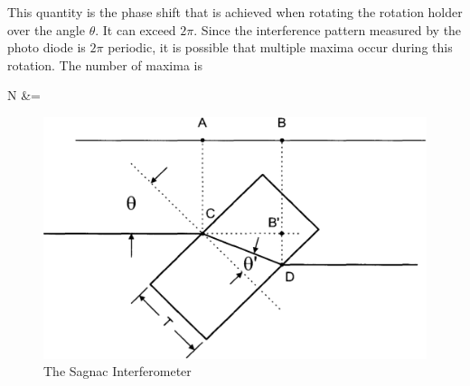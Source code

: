This quantity is the phase shift that is achieved when rotating the rotation holder over the angle $\theta$. It can exceed $2\pi$. Since the interference pattern measured by the photo diode is $2\pi$ periodic, it is possible that multiple maxima occur during this rotation. The number of maxima is 
\begin{aquation}
  N &= \frac{\Delta \varphi}{2\pi} \tp
\end{aquation}

\begin{figure}
  \includegraphics[width=\linewidth]{./figures/glasplaettchen.pdf}
  \caption{The Sagnac Interferometer}
  \label{fig:glasplaettchen}
\end{figure}



